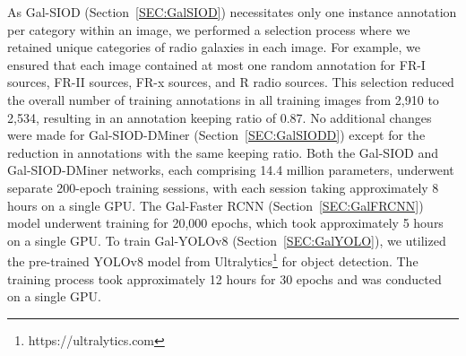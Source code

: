 \documentclass[
  journal=pasa,
  manuscript=research-paper, %
  year=2020,
  volume=37,
]{cup-journal}
\begin{document}
As Gal-SIOD (Section~\ref{SEC:GalSIOD}) necessitates only one instance annotation per category within an image, we performed a selection process where we retained unique categories of radio galaxies in each image. 
For example, we ensured that each image contained at most one random annotation for FR-I sources, FR-II sources, FR-x sources, and R radio sources. 
This selection reduced the overall number of training annotations in all training images from 2,910 to 2,534, resulting in an annotation keeping ratio of 0.87.
No additional changes were made for Gal-SIOD-DMiner (Section~\ref{SEC:GalSIODD}) except for the reduction in annotations with the same keeping ratio.
Both the Gal-SIOD and Gal-SIOD-DMiner networks, each comprising 14.4 million parameters, underwent separate 200-epoch training sessions, with each session taking approximately 8 hours on a single GPU.
The Gal-Faster RCNN (Section~\ref{SEC:GalFRCNN}) model underwent training for 20,000 epochs, which took approximately 5 hours on a single GPU.
To train Gal-YOLOv8 (Section~\ref{SEC:GalYOLO}), we utilized the pre-trained YOLOv8 model from Ultralytics\footnote{https://ultralytics.com} for object detection. The training process took approximately 12 hours for 30 epochs and was conducted on a single GPU.
\end{document}
